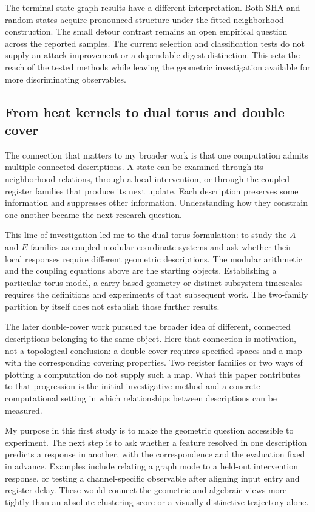 \documentclass[11pt]{article}
\begin{document}
The terminal-state graph results have a different interpretation. Both SHA and random states acquire pronounced structure under the fitted neighborhood construction. The small detour contrast remains an open empirical question across the reported samples. The current selection and classification tests do not supply an attack improvement or a dependable digest distinction. This sets the reach of the tested methods while leaving the geometric investigation available for more discriminating observables.

\subsection{From heat kernels to dual torus and double cover}\label{sec:continuity}
The connection that matters to my broader work is that one computation admits multiple connected descriptions. A state can be examined through its neighborhood relations, through a local intervention, or through the coupled register families that produce its next update. Each description preserves some information and suppresses other information. Understanding how they constrain one another became the next research question.

This line of investigation led me to the dual-torus formulation: to study the $A$ and $E$ families as coupled modular-coordinate systems and ask whether their local responses require different geometric descriptions. The modular arithmetic and the coupling equations above are the starting objects. Establishing a particular torus model, a carry-based geometry or distinct subsystem timescales requires the definitions and experiments of that subsequent work. The two-family partition by itself does not establish those further results.

The later double-cover work pursued the broader idea of different, connected descriptions belonging to the same object. Here that connection is motivation, not a topological conclusion: a double cover requires specified spaces and a map with the corresponding covering properties. Two register families or two ways of plotting a computation do not supply such a map. What this paper contributes to that progression is the initial investigative method and a concrete computational setting in which relationships between descriptions can be measured.

My purpose in this first study is to make the geometric question accessible to experiment. The next step is to ask whether a feature resolved in one description predicts a response in another, with the correspondence and the evaluation fixed in advance. Examples include relating a graph mode to a held-out intervention response, or testing a channel-specific observable after aligning input entry and register delay. These would connect the geometric and algebraic views more tightly than an absolute clustering score or a visually distinctive trajectory alone.
\end{document}
